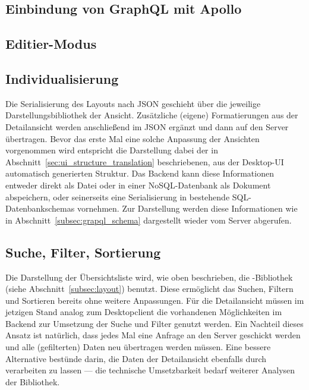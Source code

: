\subsection{Einbindung von GraphQL mit Apollo}

\subsection{Editier-Modus}

\subsection{Individualisierung}
Die Serialisierung des Layouts nach JSON geschieht über die jeweilige Darstellungsbibliothek der Ansicht. Zusätzliche (eigene) Formatierungen aus der Detailansicht werden anschließend im JSON ergänzt und dann auf den Server übertragen. Bevor das erste Mal eine solche Anpassung der Ansichten vorgenommen wird entspricht die Darstellung dabei der in Abschnitt~\ref{sec:ui_structure_translation} beschriebenen, aus der Desktop-UI automatisch generierten Struktur. Das Backend kann diese Informationen entweder direkt als Datei oder in einer NoSQL-Datenbank als Dokument abspeichern, oder seinerseits eine Serialisierung in bestehende SQL-Datenbankschemas vornehmen. Zur Darstellung werden diese Informationen wie in Abschnitt~\ref{subsec:grapql_schema} dargestellt wieder vom Server abgerufen.

\subsection{Suche, Filter, Sortierung}
Die Darstellung der Übersichtsliste wird, wie oben beschrieben, die -Bibliothek  (siehe Abschnitt~\ref{subsec:layout}) benutzt. Diese ermöglicht das Suchen, Filtern und Sortieren bereits ohne weitere Anpassungen. Für die Detailansicht müssen im jetzigen Stand analog zum Desktopclient die vorhandenen Möglichkeiten im Backend zur Umsetzung der Suche und Filter genutzt werden. Ein Nachteil dieses Ansatz ist natürlich, dass jedes Mal eine Anfrage an den Server geschickt werden und alle (gefilterten) Daten neu übertragen werden müssen. Eine bessere Alternative bestünde darin, die Daten der Detailansicht ebenfalls durch  verarbeiten zu lassen --- die technische Umsetzbarkeit bedarf weiterer Analysen der Bibliothek.

